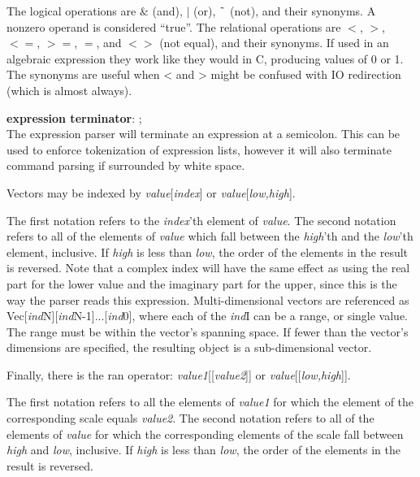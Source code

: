 The logical operations are {\vt $\&$} (and), {\vt $|$} (or), {\vt
$\symbol{126}$} (not), and their synonyms.  A nonzero operand is
considered ``true''.  The relational operations are {\vt $<$}, {\vt
$>$}, {\vt $<=$}, {\vt $>=$}, {\vt $=$}, and {\vt $<>$} (not equal),
and their synonyms.  If used in an algebraic expression they work like
they would in C, producing values of 0 or 1.  The synonyms are useful
when {\vt <} and {\vt >} might be confused with IO redirection (which
is almost always).

\begin{description}
\item{\bf expression terminator}: {\vt ;}\\
The expression parser will terminate an expression at a semicolon. 
This can be used to enforce tokenization of expression lists, however
it will also terminate command parsing if surrounded by white space.
\end{description}

Vectors may be indexed by {\it value\/}[{\it index\/}] or {\it
value\/}[{\it low,high\/}].

The first notation refers to the {\it index\/}'th element of {\it
value}.  The second notation refers to all of the elements of {\it
value} which fall between the {\it high\/}'th and the {\it low\/}'th
element, inclusive.  If {\it high} is less than {\it low}, the order
of the elements in the result is reversed.  Note that a complex index
will have the same effect as using the real part for the lower value
and the imaginary part for the upper, since this is the way the parser
reads this expression.  Multi-dimensional vectors are referenced as
Vec[{\it ind\/}N][{\it ind\/}N-1]...[{\it ind\/}0], where each of the
{\it ind\/}I can be a range, or single value.  The range must be
within the vector's spanning space.  If fewer than the vector's
dimensions are specified, the resulting object is a sub-dimensional
vector.

Finally, there is the ran operator:  {\it value1\/}[[{\it value2\/}]]
or {\it value\/}[[{\it low,high\/}]].

The first notation refers to all the elements of {\it value1} for
which the element of the corresponding scale equals {\it value2}.  The
second notation refers to all of the elements of {\it value} for which
the corresponding elements of the scale fall between {\it high} and
{\it low}, inclusive.  If {\it high} is less than {\it low}, the order
of the elements in the result is reversed.

